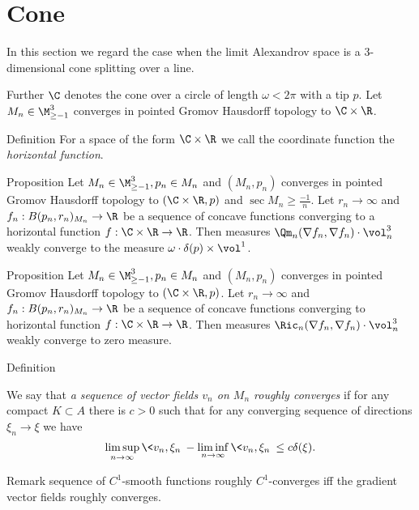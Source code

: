 
\section{Cone}

In this section we regard the case when the limit Alexandrov space
is a 3-dimensional cone splitting over a line.

Further $\C$ denotes the cone over a circle of length  $\omega<2\pi$
with a tip $p$.
Let $M_n\in\M_{\ge -1}^3$ converges in pointed
Gromov Hausdorff topology to $\C\times\R$.

\begin{thm}{Definition}
For a space of the form  $\C\times\R$
we call the
coordinate function   
the \emph{horizontal function}. 
\end{thm}

\begin{thm}{Proposition}
Let $M_n\in\M_{\ge -1}^3, p_n\in M_n$ and $(M_n,p_n)$ converges in pointed
Gromov Hausdorff topology to $(\C\times\R, p)$
and $\operatorname{sec}M_n\ge\frac{-1}{n}$.
Let $r_n\to\infty$ and $f_n:B(p_n,r_n)_{M_n}\to \R$ be a sequence of concave
functions 
converging to a horizontal function $f:\C\times\R\to\R$.
Then measures $\Qm_n(\nabla f_n, \nabla f_n)\cdot\vol^3_n$
weakly converge to the measure $\omega\cdot\delta(p)\times \vol^1$.

\end{thm}

\begin{thm}{Proposition}
Let $M_n\in\M_{\ge -1}^3, p_n\in M_n$ and $(M_n,p_n)$ converges in pointed
Gromov Hausdorff topology to $(\C\times\R, p)$.
Let $r_n\to\infty$ and $f_n:B(p_n,r_n)_{M_n}\to \R$ be a sequence of concave
functions 
converging to horizontal function $f:\C\times\R\to\R$.
Then measures $\Ric_n(\nabla f_n, \nabla f_n)\cdot\vol^3_n$
weakly converge to zero measure.

\end{thm}



\begin{thm}{Definition}

We say that \emph {a sequence of vector fields $v_n$ on $M_n$ roughly converges }
if for any compact $K\subset A$ there is $c>0$ such that
for any converging sequence of directions $\xi_n\to\xi$
we have
$$\limsup_{n\to\infty} \<v_n,\xi_n\>-
 \liminf_{n\to\infty} \<v_n,\xi_n\>\le
 c\delta(\xi).
 $$
\end{thm}

\begin{thm}{Remark}
sequence of $C^1$-smooth functions roughly $C^1$-converges
iff the gradient vector fields
roughly converges.

\end{thm}



